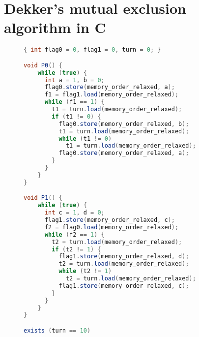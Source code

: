 \section{Dekker's mutual exclusion algorithm in C}
\label{apx:dekker}


\begin{figure}[H]
\begin{lstlisting}[language=Java,morekeywords={memory_order_relaxed}]
{ int flag0 = 0, flag1 = 0, turn = 0; }

void P0() {
    while (true) {
      int a = 1, b = 0;
      flag0.store(memory_order_relaxed, a);
      f1 = flag1.load(memory_order_relaxed);
      while (f1 == 1) {
        t1 = turn.load(memory_order_relaxed);
        if (t1 != 0) {
          flag0.store(memory_order_relaxed, b);
          t1 = turn.load(memory_order_relaxed);
          while (t1 != 0)
            t1 = turn.load(memory_order_relaxed);
          flag0.store(memory_order_relaxed, a);
        }
      }
    }
}

void P1() {
    while (true) {
      int c = 1, d = 0;
      flag1.store(memory_order_relaxed, c);
      f2 = flag0.load(memory_order_relaxed);
      while (f2 == 1) {
        t2 = turn.load(memory_order_relaxed);
        if (t2 != 1) {
          flag1.store(memory_order_relaxed, d);
          t2 = turn.load(memory_order_relaxed);
          while (t2 != 1)
            t2 = turn.load(memory_order_relaxed);
          flag1.store(memory_order_relaxed, c);
        }
      }
    }
}

exists (turn == 10)
\end{lstlisting}
\end{figure}
